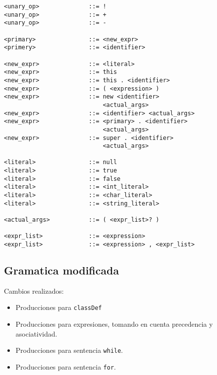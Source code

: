 \documentclass [a4paper,titlepage]{report}
\begin{document}
\begin{verbatim}
<unary_op>              ::= !
<unary_op>              ::= +
<unary_op>              ::= -

<primary>               ::= <new_expr>
<primery>               ::= <identifier>

<new_expr>              ::= <literal>
<new_expr>              ::= this
<new_expr>              ::= this . <identifier>
<new_expr>              ::= ( <expression> )
<new_expr>              ::= new <identifier> 
                            <actual_args>
<new_expr>              ::= <identifier> <actual_args>
<new_expr>              ::= <primary> . <identifier> 
                            <actual_args>
<new_expr>              ::= super . <identifier> 
                            <actual_args>

<literal>               ::= null
<literal>               ::= true
<literal>               ::= false
<literal>               ::= <int_literal>
<literal>               ::= <char_literal>
<literal>               ::= <string_literal>

<actual_args>           ::= ( <expr_list>? )

<expr_list>             ::= <expression>
<expr_list>             ::= <expression> , <expr_list>

\end{verbatim}

\subsection{Gramatica modificada}

Cambios realizados:
\begin{itemize}

\item Producciones para \texttt{classDef}

\item Producciones para expresiones, tomando en cuenta precedencia y 
asociatividad.

\item Producciones para sentencia \texttt{while}.

\item Producciones para sentencia \texttt{for}.
\end{itemize}
\end{document}
